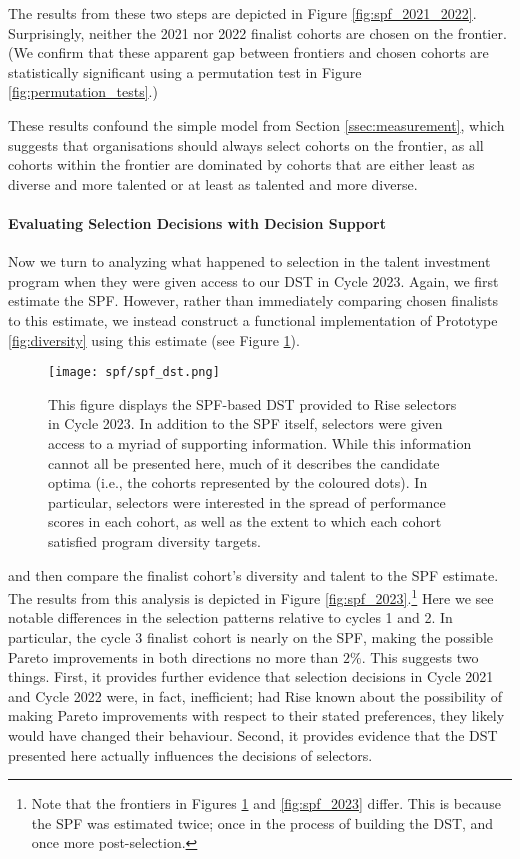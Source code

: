 The results from these two steps are depicted in Figure \ref{fig:spf_2021_2022}. Surprisingly, neither the 2021 nor 2022 finalist cohorts are chosen on the frontier. (We confirm that these apparent gap between frontiers and chosen cohorts are statistically significant using a permutation test in Figure \ref{fig:permutation_tests}.)

These results confound the simple model from Section \ref{ssec:measurement}, which suggests that organisations should always select cohorts on the frontier, as all cohorts within the frontier are dominated by cohorts that are either least as diverse and more talented or at least as talented and more diverse.

\paragraph{Evaluating Selection Decisions with Decision Support}
Now we turn to analyzing what happened to selection in the talent investment program when they were given access to our DST in Cycle 2023. Again, we first estimate the SPF. However, rather than immediately comparing chosen finalists to this estimate, we instead construct a functional implementation of Prototype \ref{fig:diversity} using this estimate (see Figure \ref{fig:spf_dst}).

\begin{figure}[htbp]
    \centering
    \texttt{[image: spf/spf\_dst.png]} 
    \caption{This figure displays the SPF-based DST provided to Rise selectors in Cycle 2023. In addition to the SPF itself, selectors were given access to a myriad of supporting information. While this information cannot all be presented here, much of it describes the candidate optima (i.e., the cohorts represented by the coloured dots). In particular, selectors were interested in the spread of performance scores in each cohort, as well as the extent to which each cohort satisfied program diversity targets.}
    \label{fig:spf_dst}
\end{figure}

and then compare the finalist cohort's diversity and talent to the SPF estimate. The results from this analysis is depicted in Figure \ref{fig:spf_2023}.\footnote{Note that the frontiers in Figures \ref{fig:spf_dst} and \ref{fig:spf_2023} differ. This is because the SPF was estimated twice; once in the process of building the DST, and once more post-selection.} Here we see notable differences in the selection patterns relative to cycles 1 and 2. In particular, the cycle 3 finalist cohort is nearly on the SPF, making the possible Pareto improvements in both directions no more than $2\%$. This suggests two things. First, it provides further evidence that selection decisions in Cycle 2021 and Cycle 2022 were, in fact, inefficient; had Rise known about the possibility of making Pareto improvements with respect to their stated preferences, they likely would have changed their behaviour. Second, it provides evidence that the DST presented here actually influences the decisions of selectors. 

